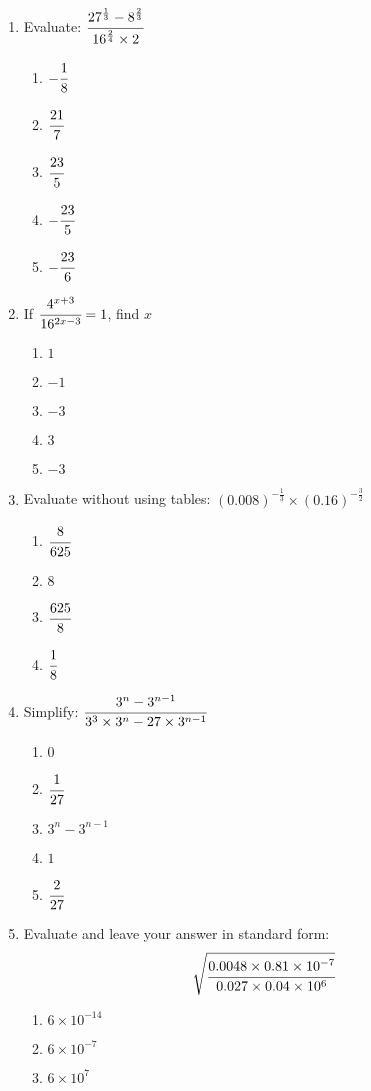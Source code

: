 \begin{multicols}{2}
\begin{enumerate}[label={\arabic*.}]
\item Evaluate: $\cfrac{27^{\frac{1}{3}} - 8^{\frac{2}{3}}}{16^{\frac{2}{4}} \times 2}$ 
	\begin{enumerate}[label={\Alph*.}]
	\item \(-\cfrac{1}{8}\)
	\item \(\cfrac{21}{7}\)
	\item \(\cfrac{23}{5}\)
	\item \(-\cfrac{23}{5}\)
	\item \(-\cfrac{23}{6}\)
	\end{enumerate}
\item If \(\cfrac{4^{x+3}}{16^{2x -3}} = 1\), find $x$
	\begin{enumerate}[label={\Alph*.}]
	\item \(1\)
	\item \(-1\)
	\item \(-3\)
	\item \(3\)
	\item \(-3\)
	\end{enumerate}
\item Evaluate without using tables: $(0.008)^{-\frac{1}{3}} \times (0.16)^{-\frac{3}{2}}$
	\begin{enumerate}[label={\Alph*.}]
	\item \(\cfrac{8}{625}\)
	\item \(8\)
	\item \(\cfrac{625}{8}\)
	\item \(\cfrac{1}{8}\)
	\end{enumerate}
\item Simplify: $\cfrac{3^n - 3^{n-1}}{3^3 \times 3^n - 27 \times 3^{n-1}}$
	\begin{enumerate}[label={\Alph*.}]
	\item \(0\)
	\item \(\cfrac{1}{27}\)
	\item \(3^n - 3^{n-1}\)
	\item \(1\)
	\item \(\cfrac{2}{27}\)
	\end{enumerate}
\item Evaluate and leave your answer in standard form: 
\[\sqrt{\cfrac{0.0048 \times 0.81 \times 10^{-7}}{0.027 \times 0.04 \times 10^6}}\]
	\begin{enumerate}[label={\Alph*.}]
	\item \(6 \times 10^{-14}\)
	\item \(6 \times 10^{-7}\)
	\item \(6 \times 10^7\)

\end{enumerate}
\end{enumerate}
\end{multicols}
